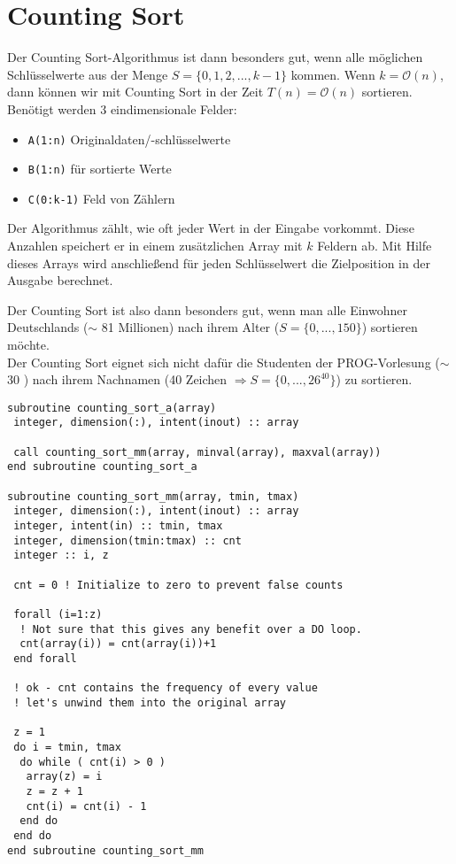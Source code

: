 \section{Counting Sort}

Der Counting Sort-Algorithmus ist dann besonders gut, wenn alle möglichen Schlüsselwerte aus der Menge $S=\{0,1,2,...,k-1\}$ kommen. Wenn $k=\mathcal{O}(n)$, dann können wir mit Counting Sort in der Zeit $T(n)=\mathcal{O}(n)$ sortieren. Benötigt werden 3 eindimensionale Felder:
\begin{itemize}
	\item \texttt{A(1:n)} Originaldaten/-schlüsselwerte
	\item \texttt{B(1:n)} für sortierte Werte
	\item \texttt{C(0:k-1)} Feld von Zählern
\end{itemize}
Der Algorithmus zählt, wie oft jeder Wert in der Eingabe vorkommt. Diese Anzahlen speichert er in einem zusätzlichen Array mit $k$ Feldern ab. Mit Hilfe dieses Arrays wird anschließend für jeden Schlüsselwert die Zielposition in der Ausgabe berechnet.

\begin{*anmerkung}
	Der Counting Sort ist also dann besonders gut, wenn man alle Einwohner Deutschlands ($\sim$ 81 Millionen) nach ihrem Alter ($S=\{0,...,150\}$) sortieren möchte. \\
	Der Counting Sort eignet sich nicht dafür die Studenten der PROG-Vorlesung ($\sim$ 30 \smiley{}) nach ihrem Nachnamen (40 Zeichen $\Rightarrow S=\{0,...,26^{40}\}$) zu sortieren.
\end{*anmerkung}

\begin{lstlisting}
subroutine counting_sort_a(array)
 integer, dimension(:), intent(inout) :: array

 call counting_sort_mm(array, minval(array), maxval(array))
end subroutine counting_sort_a

subroutine counting_sort_mm(array, tmin, tmax)
 integer, dimension(:), intent(inout) :: array
 integer, intent(in) :: tmin, tmax
 integer, dimension(tmin:tmax) :: cnt
 integer :: i, z

 cnt = 0 ! Initialize to zero to prevent false counts
 
 forall (i=1:z)  
  ! Not sure that this gives any benefit over a DO loop.
  cnt(array(i)) = cnt(array(i))+1
 end forall
 
 ! ok - cnt contains the frequency of every value
 ! let's unwind them into the original array
 
 z = 1
 do i = tmin, tmax
  do while ( cnt(i) > 0 )
   array(z) = i
   z = z + 1
   cnt(i) = cnt(i) - 1
  end do
 end do
end subroutine counting_sort_mm
\end{lstlisting}